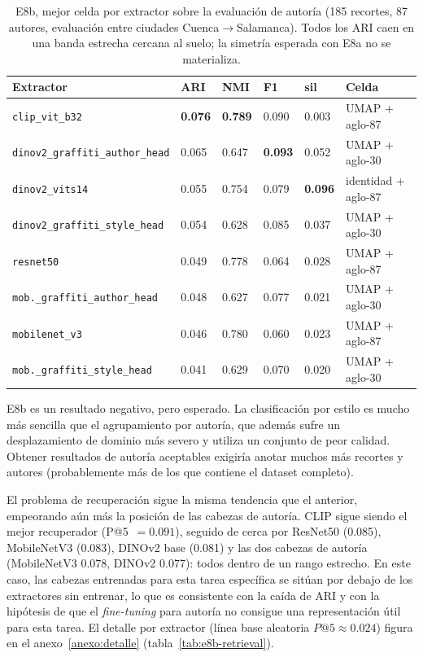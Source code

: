 \begin{table}[h]
\caption[E8b, mejor celda por extractor (autoría)]{E8b, mejor celda por extractor sobre la evaluación de autoría
(185 recortes, 87 autores, evaluación entre ciudades Cuenca$\to$Salamanca).
Todos los ARI caen en una banda estrecha cercana al suelo; la simetría
esperada con E8a no se materializa.}
\label{tab:e8b-best}
\centering
{\footnotesize
\begin{tabular}{|p{4.4cm}|p{0.7cm}|p{0.7cm}|p{0.7cm}|p{0.7cm}|p{3.0cm}|} \hline
  \textbf{Extractor} & \textbf{ARI} & \textbf{NMI} & \textbf{F1} & \textbf{sil} & \textbf{Celda} \\ \hline
  \texttt{clip\_vit\_b32}                     & \textbf{0.076} & \textbf{0.789} & 0.090 & 0.003 & UMAP + aglo-87 \\ \hline
  \texttt{dinov2\_graffiti\_author\_head}     & 0.065 & 0.647 & \textbf{0.093} & 0.052 & UMAP + aglo-30 \\ \hline
  \texttt{dinov2\_vits14}                     & 0.055 & 0.754 & 0.079 & \textbf{0.096} & identidad + aglo-87 \\ \hline
  \texttt{dinov2\_graffiti\_style\_head}      & 0.054 & 0.628 & 0.085 & 0.037 & UMAP + aglo-30 \\ \hline
  \texttt{resnet50}                           & 0.049 & 0.778 & 0.064 & 0.028 & UMAP + aglo-87 \\ \hline
  \texttt{mob.\_graffiti\_author\_head}       & 0.048 & 0.627 & 0.077 & 0.021 & UMAP + aglo-30 \\ \hline
  \texttt{mobilenet\_v3}                      & 0.046 & 0.780 & 0.060 & 0.023 & UMAP + aglo-87 \\ \hline
  \texttt{mob.\_graffiti\_style\_head}        & 0.041 & 0.629 & 0.070 & 0.020 & UMAP + aglo-30 \\ \hline
\end{tabular}
}
\end{table}

E8b es un resultado negativo, pero esperado. La clasificación por estilo es
mucho más sencilla que el agrupamiento por autoría, que además sufre un
desplazamiento de dominio más severo y utiliza un conjunto de peor calidad.
Obtener resultados de autoría aceptables exigiría anotar muchos más recortes y
autores (probablemente más de los que contiene el dataset completo).

El problema de recuperación sigue la misma tendencia que el anterior,
empeorando aún más la posición de las cabezas de autoría. CLIP sigue siendo el
mejor recuperador (P@5~$=0.091$), seguido de cerca por ResNet50 (0.085),
MobileNetV3 (0.083), DINOv2 base (0.081) y las dos cabezas de autoría
(MobileNetV3 0.078, DINOv2 0.077): todos dentro de un rango estrecho. En este
caso, las cabezas entrenadas para esta tarea específica se sitúan por debajo de
los extractores sin entrenar, lo que es consistente con la caída de ARI y con
la hipótesis de que el \textit{fine-tuning} para autoría no consigue una
representación útil para esta tarea. El detalle por extractor (línea base
aleatoria $P@5 \approx 0.024$) figura en el anexo~\ref{anexo:detalle}
(tabla~\ref{tab:e8b-retrieval}).

